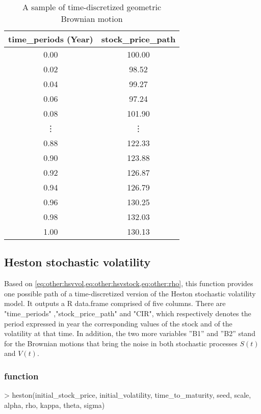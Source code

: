 \documentclass[12pt]{report}
\begin{document}
\begin{appendices}
\begin{table}[H]
\begin{tabular}{cc}
  \hline
 time\_periods (Year) & stock\_price\_path \\ 
  \hline
 0.00 & 100.00 \\ 
 0.02 & 98.52 \\ 
 0.04 & 99.27 \\ 
 0.06 & 97.24 \\ 
 0.08 & 101.90 \\ 
 \vdots & \vdots \\
 0.88 & 122.33 \\ 
 0.90 & 123.88 \\ 
 0.92 & 126.87 \\ 
 0.94 & 126.79 \\ 
 0.96 & 130.25 \\ 
 0.98 & 132.03 \\ 
 1.00 & 130.13 \\ 
   \hline
\end{tabular}
\caption{A sample of time-discretized geometric Brownian motion}
\end{table}

%
\subsection{Heston stochastic volatility}
\label{sub:r:time:heston}

Based on \cref{eq:other:hsvvol,eq:other:hsvstock,eq:other:rho}, this function provides one possible path of a time-discretized version of the Heston stochastic volatility model.
It outputs a R data.frame comprised of five columns. 
There are "time\_periods" ,"stock\_price\_path" and "CIR", which respectively denotes the period expressed in year the corresponding values of the stock and of the volatility at that time.
In addition, the two more variables ”B1” and ”B2” stand for the Brownian motions that bring the noise in both stochastic processes $S(t)$ and $V(t)$.

\subsubsection*{function}

\begin{Schunk}
\begin{Sinput}
> heston(initial_stock_price, initial_volatility, time_to_maturity, 
        seed, scale, alpha, rho, kappa, theta, sigma)
\end{Sinput}
\end{Schunk}


\end{appendices}
\end{document}
